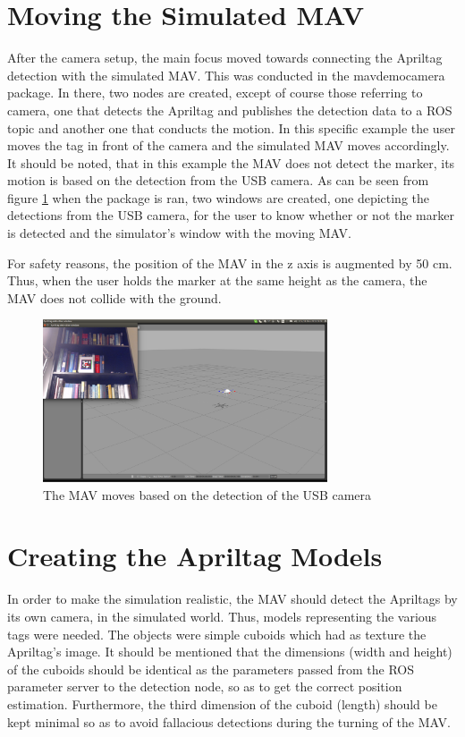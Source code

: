 \section{Moving the Simulated MAV}
\label{sec:movingMAV}
After the camera setup, the main focus moved towards connecting the Apriltag detection with the simulated MAV. This was conducted in the mav\textunderscore demo\textunderscore camera package. In there, two nodes are created, except of course those referring to camera, one that detects the Apriltag and publishes the detection data to a ROS topic and another one that conducts the motion. In this specific example the user moves the tag in front of the camera and the simulated MAV moves accordingly. It should be noted, that in this example the MAV does not detect the marker, its motion is based on the detection from the USB camera. As can be seen from figure \ref{pics:mav_demo_camera} when the package is ran, two windows are created, one depicting the detections from the USB camera, for the user to know whether or not the marker is detected and the simulator's window with the moving MAV.  

For safety reasons, the position of the MAV in the z axis is augmented by 50 cm. Thus, when the user holds the marker at the same height as the camera, the MAV does not collide with the ground.

\begin{figure}
   \centering
   \includegraphics[width=0.75\textwidth]{images/mav_demo_camera.pdf}
   \caption{The MAV moves based on the detection of the USB camera}
   \label{pics:mav_demo_camera}
\end{figure}


\section{Creating the Apriltag Models}
\label{sec:cubeRobots}

In order to make the simulation realistic, the MAV should detect the Apriltags by its own camera, in the simulated world. Thus, models representing the various tags were needed. The objects were simple cuboids which had as texture the Apriltag's image. It should be mentioned that the dimensions (width and height) of the cuboids should be identical as the parameters passed from the ROS parameter server to the detection node, so as to get the correct position estimation. Furthermore, the third dimension of the cuboid (length) should be kept minimal so as to avoid fallacious detections during the turning of the MAV.


